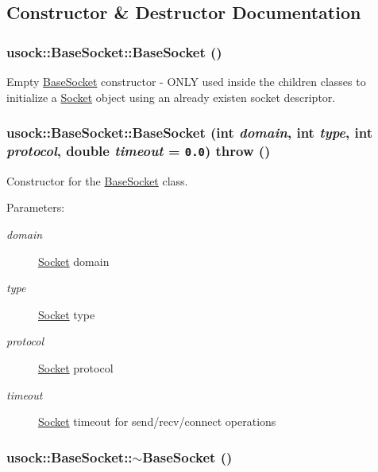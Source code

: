 \subsection{Constructor \& Destructor Documentation}
\hypertarget{classusock_1_1BaseSocket_20f598433d6c3a97656f0179f7371218}{
\subsubsection[{BaseSocket}]{\setlength{\rightskip}{0pt plus 5cm}usock::BaseSocket::BaseSocket ()}}
\label{classusock_1_1BaseSocket_20f598433d6c3a97656f0179f7371218}


Empty \hyperlink{classusock_1_1BaseSocket}{BaseSocket} constructor - ONLY used inside the children classes to initialize a \hyperlink{classusock_1_1Socket}{Socket} object using an already existen socket descriptor. 

\hypertarget{classusock_1_1BaseSocket_5cf4bfad30ea514f522101899592b97f}{
\subsubsection[{BaseSocket}]{\setlength{\rightskip}{0pt plus 5cm}usock::BaseSocket::BaseSocket (int {\em domain}, \/  int {\em type}, \/  int {\em protocol}, \/  double {\em timeout} = {\tt 0.0})  throw ()}}
\label{classusock_1_1BaseSocket_5cf4bfad30ea514f522101899592b97f}


Constructor for the \hyperlink{classusock_1_1BaseSocket}{BaseSocket} class. 

\begin{Desc}
\item[Parameters:]
\begin{description}
\item[{\em domain}]\hyperlink{classusock_1_1Socket}{Socket} domain \item[{\em type}]\hyperlink{classusock_1_1Socket}{Socket} type \item[{\em protocol}]\hyperlink{classusock_1_1Socket}{Socket} protocol \item[{\em timeout}]\hyperlink{classusock_1_1Socket}{Socket} timeout for send/recv/connect operations \end{description}
\end{Desc}
\hypertarget{classusock_1_1BaseSocket_60ad362afb927b4d4e7233c5e9735c7b}{
\subsubsection[{$\sim$BaseSocket}]{\setlength{\rightskip}{0pt plus 5cm}usock::BaseSocket::$\sim$BaseSocket ()}}
\label{classusock_1_1BaseSocket_60ad362afb927b4d4e7233c5e9735c7b}


